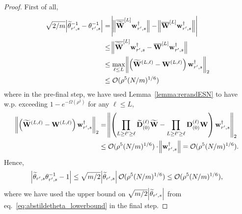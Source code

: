 		\begin{proof}
			First of all,
			\begin{align*}
				\sqrt{2/m} \abs{\widetilde{\theta}_{r', s}^{-1} - \theta_{r', s}^{-1} } &= 
				\abs{\norm[2]{\overline{\widetilde{\mathbf{W}}}^{[L]} \mathbf{w}_{r', s}^{\dagger}} - \norm[2]{\overline{\mathbf{W}}^{[L]} \mathbf{w}_{r', s}^{\dagger}}} \\& \le 
				\norm[2]{\overline{\widetilde{\mathbf{W}}}^{[L]} \mathbf{w}_{r', s}^{\dagger}- \overline{\mathbf{W}}^{[L]} \mathbf{w}_{r', s}^{\dagger}}  \\&
				\le \max_{\ell \le L} \norm{\left(\widetilde{\mathbf{W}}^{(L, 
						\ell)} - \mathbf{W}^{(L, \ell)}\right) \mathbf{w}_{r', s}^{\dagger}}_2  \\&
				\le \mathcal{O}(\rho^5 (N/m)^{1/6})
			\end{align*}
			where in the pre-final step, we have used Lemma~\ref{lemma:rerandESN} to have w.p. exceeding $1-e^{-\Omega(\rho^2)}$ for any $\ell \le L$,
			\begin{align*}
				\norm{\left(\widetilde{\mathbf{W}}^{(L,
						\ell)} - \mathbf{W}^{(L, \ell)}\right) \mathbf{w}_{r', s}^{\dagger}}_2 &= \norm{\left( \prod_{L \ge \ell' \ge \ell} \widetilde{\mathbf{D}}_{(0)}^{(\ell)} \widetilde{\mathbf{W}}  - \prod_{L \ge \ell' \ge \ell} \mathbf{D}_{(0)}^{(\ell)} \mathbf{W} \right)  \mathbf{w}_{r', s}^{\dagger}}_2\\& \le  \mathcal{O}(\rho^5 (N/m)^{1/6}) \cdot \norm[2]{\mathbf{w}_{r', s}^{\dagger}} = \mathcal{O}(\rho^5 (N/m)^{1/6}).
			\end{align*}
			Hence,
			\begin{align*}
				\abs{ \widetilde{\theta}_{r', s} \theta_{r', s}^{-1} - 1} \le \sqrt{m/2} \abs{\widetilde{\theta}_{r', s} }  \mathcal{O}(\rho^5 (N/m)^{1/6}) \le
				\mathcal{O}(\rho^5 (N/m)^{1/6}),
			\end{align*}
			where we have used the upper bound on $\sqrt{m/2} \abs{\widetilde{\theta}_{r', s} }$ from eq.~\ref{eq:abstildetheta_lowerbound} in the final step. 
		\end{proof}
		
	
		
		
